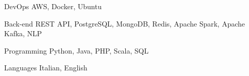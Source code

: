 

\begin{cvskills}

  \cvskill
    {DevOps} %
    {AWS, Docker, Ubuntu} %

  \cvskill
    {Back-end} %
    {REST API, PostgreSQL, MongoDB, Redis, Apache Spark, Apache Kafka, NLP} %

  \cvskill
    {Programming} %
    {Python, Java, PHP, Scala, SQL} %

  \cvskill
    {Languages} %
    {Italian, English} %

\end{cvskills}
